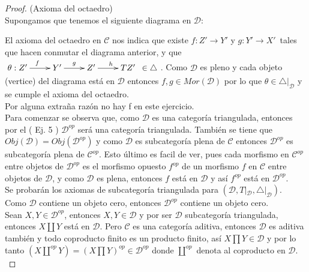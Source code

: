 \documentclass{article}
\begin{document}
\begin{enumerate}
\begin{proof}
 (Axioma del octaedro)\\
Supongamos que tenemos el siguiente diagrama en $\mathscr{D}$:\\
\centerline{
} 
El axioma del octaedro en $\mathscr{C}$ nos indica que existe $f:Z'\to Y'$ y $g:Y'\to X'$ \,tales que hacen conmutar el diagrama anterior, y que\\
$\xymatrix{\theta:Z'\ar[r]^f&Y'\ar[r]^g&Z'\ar[r]^{h\quad}&TZ' \,\,\, \in \triangle}$. Como $\mathscr{D}$ es pleno y cada objeto (vertice) 
del diagrama está en 
$\mathscr{D}$ entonces $f,g\in Mor(\mathscr{D})$ por lo que $\theta\in  \triangle|_{\mathscr{D}}$ y se cumple el axioma del octaedro.\\

 Por alguna extraña razón no hay f en este ejercicio.\\

 Para comenzar se observa que, como $\mathscr{D}$ es una categoría triangulada, entonces por el ( Ej. 5 )  $\mathscr{D}^{op}$ 
será una categoría triangulada. También se tiene que $Obj(\mathscr{D})=Obj(\mathscr{D}^{op})$ y como $\mathscr{D}$ es subcategoría plena de 
$\mathscr{C}$ entonces $\mathscr{D}^{op}$ es subcategoría plena de $\mathscr{C}^{op}$. Esto último es facil de ver, pues cada morfismo en 
$\mathscr{C}^{op}$ entre objetos de $\mathscr{D}^{op}$ es el morfismo opuesto $f^{op}$ de un morfismo $f$ en $\mathscr{C}$ entre objetos de
$\mathscr{D}$, y como $\mathscr{D}$ es plena, entonces $f$ está en $\mathscr{D}$ y así $f^{op}$ está en $\mathscr{D}^{op}$.\\

Se probarán los axiomas de subcategoría triangulada para $(\mathscr{D},T|_\mathscr{D},\triangle|_\mathscr{D})$.\\

 Como $\mathscr{D}$ contiene un objeto cero, entonces $\mathscr{D}^{op}$ contiene un objeto cero.\\

 Sean $X,Y\in\mathscr{D}^{op}$, entonces $X,Y\in\mathscr{D}$ y por ser $\mathscr{D}$ subcategoría triangulada, entonces $X\coprod Y$ 
está en $\mathscr{D}$. Pero $\mathscr{C}$ es una categoría aditiva, entonces $\mathscr{D}$ es aditiva también y todo coproducto finito es un producto 
finito, así $X\prod Y\in \mathscr{D}$ y por lo tanto $\left(X\coprod^{op} Y\right)=\left(X\prod Y\right)^{op}\in \mathscr{D}^{op}$ donde 
$\coprod^{op}$ denota al coproducto en $\mathscr{D}$.\\


\end{proof}
\end{enumerate}
\end{document}
